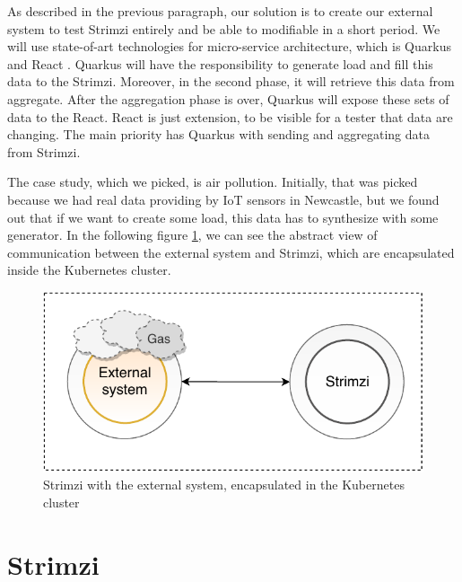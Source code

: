 \documentclass{ExcelAtFIT}
\begin{document}
As described in the previous paragraph, our solution is to create our external system to test Strimzi entirely and be able to modifiable in a short period. We will use state-of-art technologies for micro-service architecture, which is Quarkus and React \cite{React}. Quarkus will have the responsibility to generate load and fill this data to the Strimzi. Moreover, in the second phase, it will retrieve this data from aggregate. After the aggregation phase is over, Quarkus will expose these sets of data to the React. React is just extension, to be visible for a tester that data are changing. The main priority has Quarkus with sending and aggregating data from Strimzi. 

The case study, which we picked, is air pollution. Initially, that was picked because we had real data providing by IoT sensors in Newcastle, but we found out that if we want to create some load, this data has to synthesize with some generator. In the following figure \ref{fig:strimziWithExternalSystem}, we can see the abstract view of communication between the external system and Strimzi, which are encapsulated inside the Kubernetes cluster.

\begin{figure}[h!]
	\centering
	\includegraphics[width=1\linewidth]{images/01-introduction/TitleForArticleWithColor.pdf}
	\caption{Strimzi with the external system, encapsulated in the Kubernetes cluster}
	\label{fig:strimziWithExternalSystem}
\end{figure}


\section{Strimzi}
\label{sec:HowToUse}
\end{document}
